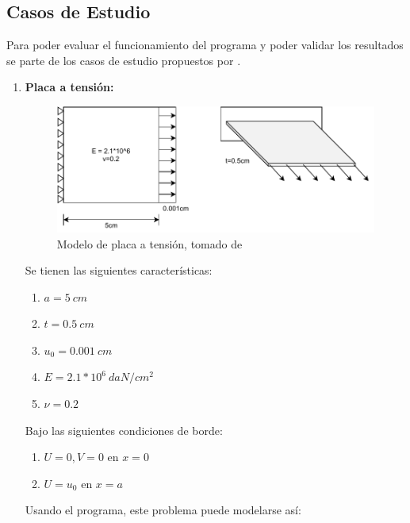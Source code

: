 	\subsection{Casos de Estudio}
	\label{sub:casosestudio}
	Para poder evaluar el funcionamiento del programa y poder validar los resultados se parte de los casos de estudio propuestos por \textcite{Pisano2009}.

	\begin{enumerate}
		\item \textbf{Placa a tensión:}

		\begin{figure}
			\centering
			\sffamily
			\includegraphics[width=\textwidth]{figuras/placa.pdf}
			\caption{Modelo de placa a tensión, tomado de \textcite{Pisano2009}}
			\label{fig:placa_tension}
		\end{figure}

		Se tienen las siguientes características:
		\begin{enumerate}
			\item[] $a = 5\ cm$
			\item[] $t = 0.5\ cm$
			\item[] $u_0 = 0.001\ cm$
			\item[] $E = 2.1*10^6\ daN/cm^2$
			\item[] $\nu = 0.2$
		\end{enumerate}

		Bajo las siguientes condiciones de borde:
		\begin{enumerate}
			\item[] $U = 0,V=0$ en $x=0$
			\item[] $U = u_0$ en $x=a$
		\end{enumerate}

		Usando el programa, este problema puede modelarse así:


\end{enumerate}
